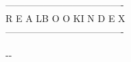 \documentclass[fontsize=8pt,twoside]{scrartcl}
\begin{document}
\selectfont
\thispagestyle{plain}
\begin{center}
  -------------------------------------\\
  R E A L\qquad B O O K\qquad I N D E X\\
  -------------------------------------\\
\end{center}
\begin{center}
  
\end{center}
\begin{multicols}{4}
  \raggedright
  \tableofcontents
  \vspace{\fill}
  
  \begin{center}
    \the\year-\the\month-\the\day
  \end{center}
\end{multicols}
\end{document}
